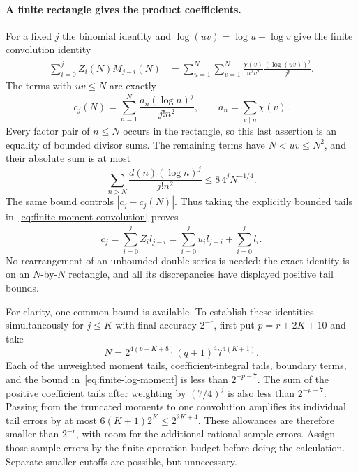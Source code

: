 \paragraph{A finite rectangle gives the product coefficients.}
For a fixed $j$ the binomial identity and
$\log(uv)=\log u+\log v$ give the finite convolution identity
\begin{align}
 \sum_{i=0}^jZ_i(N)M_{j-i}(N)
  &=\sum_{u=1}^N\sum_{v=1}^N
       \frac{\chi(v)}{u^2v^2}
       \frac{(\log(uv))^j}{j!}.
 \label{eq:finite-moment-convolution}
\end{align}
The terms with $uv\leq N$ are exactly
\[
 c_j(N)=\sum_{n=1}^N\frac{a_n(\log n)^j}{j!n^2},
 \qquad a_n=\sum_{v\mid n}\chi(v).
\]
Every factor pair of $n\leq N$ occurs in the rectangle, so this last
assertion is an equality of bounded divisor sums.  The remaining terms have
$N<uv\leq N^2$, and their absolute sum is at most
\[
 \sum_{n>N}\frac{d(n)(\log n)^j}{j!n^2}
       \leq8\,4^jN^{-1/4}.
\]
The same bound controls $|c_j-c_j(N)|$.  Thus taking the explicitly bounded
tails in~\eqref{eq:finite-moment-convolution} proves
\begin{equation}
 c_j=\sum_{i=0}^j Z_i l_{j-i}
     =\sum_{i=0}^j u_i l_{j-i}+\sum_{i=0}^j l_i.
 \label{eq:finite-product-coefficient-identity}
\end{equation}
No rearrangement of an unbounded double series is needed: the exact
identity is on an $N$-by-$N$ rectangle, and all its discrepancies have
displayed positive tail bounds.

For clarity, one common bound is available.  To establish these identities
simultaneously for $j\leq K$ with final accuracy $2^{-r}$, first put
$p=r+2K+10$ and take
\[
 N=2^{4(p+K+8)}(q+1)^4 7^{4(K+1)}.
\]
Each of the unweighted moment tails, coefficient-integral tails, boundary
terms, and the bound in~\eqref{eq:finite-log-moment} is less than
$2^{-p-7}$.  The sum of the positive coefficient tails after weighting by
$(7/4)^j$ is also less than $2^{-p-7}$.  Passing from the truncated
moments to one convolution amplifies its individual tail errors by at most
$6(K+1)2^K\leq2^{2K+4}$.  These allowances are therefore smaller than
$2^{-r}$, with room for the additional rational sample errors.  Assign
those sample errors by the finite-operation budget before doing the
calculation.  Separate smaller cutoffs are possible, but unnecessary.

